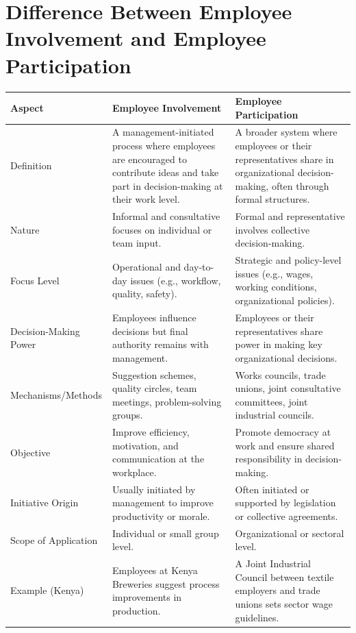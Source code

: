 \documentclass[10pt]{article}
\begin{document}
\section*{Difference Between Employee Involvement and Employee Participation}
\begin{center}
\begin{tabular}{|l|l|l|}
\hline
Aspect & Employee Involvement & Employee Participation \\
\hline
Definition & A management-initiated process where employees are encouraged to contribute ideas and take part in decision-making at their work level. & A broader system where employees or their representatives share in organizational decision-making, often through formal structures. \\
\hline
Nature & Informal and consultative focuses on individual or team input. & Formal and representative involves collective decision-making. \\
\hline
Focus Level & Operational and day-to-day issues (e.g., workflow, quality, safety). & Strategic and policy-level issues (e.g., wages, working conditions, organizational policies). \\
\hline
Decision-Making Power & Employees influence decisions but final authority remains with management. & Employees or their representatives share power in making key organizational decisions. \\
\hline
Mechanisms/Methods & Suggestion schemes, quality circles, team meetings, problem-solving groups. & Works councils, trade unions, joint consultative committees, joint industrial councils. \\
\hline
Objective & Improve efficiency, motivation, and communication at the workplace. & Promote democracy at work and ensure shared responsibility in decision-making. \\
\hline
Initiative Origin & Usually initiated by management to improve productivity or morale. & Often initiated or supported by legislation or collective agreements. \\
\hline
Scope of Application & Individual or small group level. & Organizational or sectoral level. \\
\hline
Example (Kenya) & Employees at Kenya Breweries suggest process improvements in production. & A Joint Industrial Council between textile employers and trade unions sets sector wage guidelines. \\
\hline
\end{tabular}
\end{center}
\end{document}

